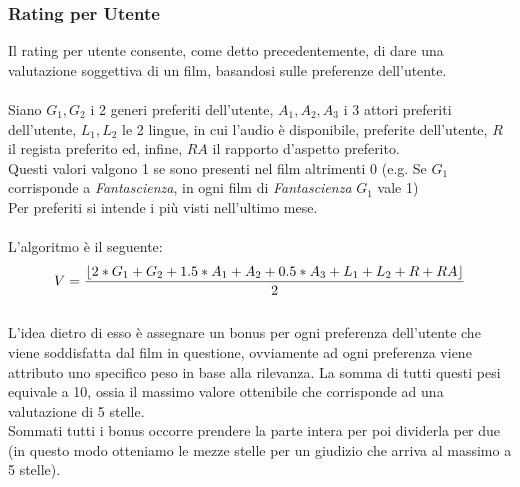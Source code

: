 \documentclass{article}
\DeclarePairedDelimiter\floor{\lfloor}{\rfloor}
\begin{document}
\subsubsection{Rating per Utente}
Il rating per utente consente, come detto precedentemente, di dare una valutazione soggettiva di un film, basandosi sulle preferenze dell'utente. \\ \\ 
Siano $G_{1}, G_{2}$ i 2 generi preferiti dell'utente, $A_{1}, A_{2}, A_{3}$ i 3 attori preferiti dell'utente, $L_{1}, L_{2}$ le 2 lingue, in cui l'audio è disponibile, preferite dell'utente, $R$ il regista preferito ed, infine, $RA$ il rapporto d'aspetto preferito. \\
Questi valori valgono 1 se sono presenti nel film altrimenti 0 (e.g. Se $G_{1}$ corrisponde a \textit{Fantascienza}, in ogni film di \textit{Fantascienza} $G_{1}$ vale 1) \\
Per preferiti si intende i più visti nell'ultimo mese. \\ \\ 
L'algoritmo è il seguente: \\
\[ V = \frac{\floor*{2 * G_{1} + G_{2} + 1.5 * A_{1} + A_{2} + 0.5 * A_{3} + L_{1} + L_{2} + R + RA}}{2}\] \\
L'idea dietro di esso è assegnare un bonus per ogni preferenza dell'utente che viene soddisfatta dal film in questione, ovviamente ad ogni preferenza viene attributo uno specifico peso in base alla rilevanza. La somma di tutti questi pesi equivale a 10, ossia il massimo valore ottenibile che corrisponde ad una valutazione di 5 stelle. \\
Sommati tutti i bonus occorre prendere la parte intera per poi dividerla per due (in questo modo otteniamo le mezze stelle per un giudizio che arriva al massimo a 5 stelle).
\end{document}
